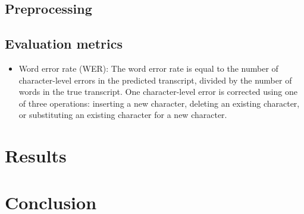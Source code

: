 \documentclass[conference]{IEEEtran}
\begin{document}
\subsection{Preprocessing}

\subsection{Evaluation metrics}
\begin{itemize}
    \item Word error rate (WER): The word error rate is equal to the number of character-level errors in the predicted transcript, 
    divided by the number of words in the true transcript. One character-level error is corrected using one of three operations:
    inserting a new character, deleting an existing character, or substituting an existing character for a new character.
\end{itemize}



\section{Results}\label{sec:results}



\section{Conclusion}\label{sec:conclusion}



\begin{thebibliography}{1}

\end{thebibliography}
\end{document}
